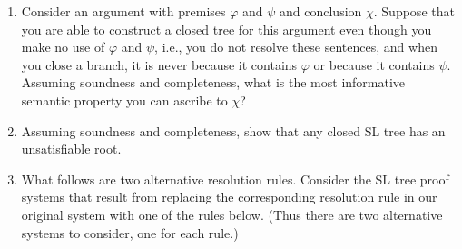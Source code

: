 \documentclass[12pt]{article}
\begin{document}
\begin{enumerate}


\item 
  Consider an argument with premises $\varphi$ and $\psi$ and conclusion $\chi$.
  Suppose that you are able to construct a closed tree for this argument even though you make no use of $\varphi$ and $\psi$, i.e., you do not resolve these sentences, and when you close a branch, it is never because it contains $\varphi$ or because it contains $\psi$.
  Assuming soundness and completeness, what is the most informative semantic property you can ascribe to $\chi$? 



\item Assuming soundness and completeness, show that any closed SL tree has an unsatisfiable root.
  





\item
What follows are two alternative resolution rules.
Consider the SL tree proof systems that result from replacing the corresponding resolution rule in our original system with one of the rules below.
(Thus there are two alternative systems to consider, one for each rule.)


\begin{multicols}{2}


\end{multicols}
\end{enumerate}
\end{document}
